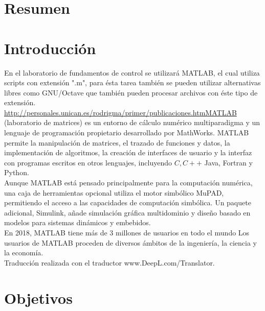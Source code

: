 \documentclass[]{article}
\begin{document}

\tableofcontents  %


\section{Resumen}

\section{Introducción}

En el laboratorio de fundamentos de control se utilizará MATLAB, el cual utiliza scripts con extensión ".m", para ésta tarea también se pueden utilizar alternativas libres como GNU/Octave que también pueden procesar archivos con éste tipo de extensión.\\

\url{http://personales.unican.es/rodrigma/primer/publicaciones.htmMATLAB} (laboratorio de matrices) es un entorno de cálculo numérico multiparadigma y un lenguaje de programación propietario desarrollado por MathWorks. MATLAB permite la manipulación de matrices, el trazado de funciones y datos, la implementación de algoritmos, la creación de interfaces de usuario y la interfaz con programas escritos en otros lenguajes, incluyendo $C, C++$ Java, Fortran y Python.\cite{MATLABWiki}\\

Aunque MATLAB está pensado principalmente para la computación numérica, una caja de herramientas opcional utiliza el motor simbólico MuPAD, permitiendo el acceso a las capacidades de computación simbólica. Un paquete adicional, Simulink, añade simulación gráfica multidominio y diseño basado en modelos para sistemas dinámicos y embebidos.\cite{MATLABWiki}\\

En 2018, MATLAB tiene más de 3 millones de usuarios en todo el mundo Los usuarios de MATLAB proceden de diversos ámbitos de la ingeniería, la ciencia y la economía.\cite{MATLABWiki}\\ 

Traducción realizada con el traductor www.DeepL.com/Translator.\cite{Deepl}

\section{Objetivos}
\end{document}

